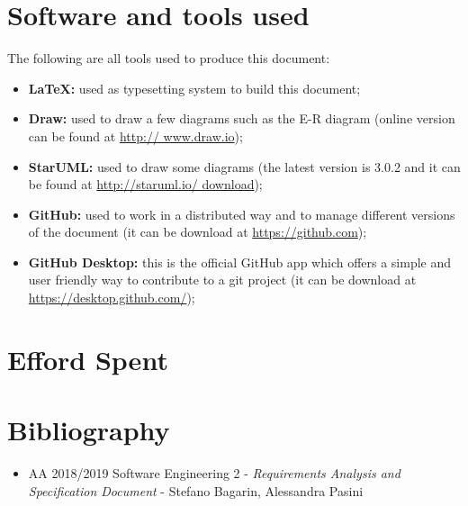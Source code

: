\section{Software and tools used}
The following are all tools used to produce this document:
\begin{itemize}
	\item \textbf{\LaTeX:} used as typesetting system to build this document;
	\item \textbf{Draw:} used to draw a few diagrams such as the E-R diagram (online version can be found at \url{http://				www.draw.io});
	\item \textbf{StarUML:} used to draw some diagrams (the latest version is 3.0.2 and it can be found at \url{http://staruml.io/			download});
	\item \textbf{GitHub:} used to work in a distributed way and to manage different versions of the document (it can be download at		\url{https://github.com});
	\item \textbf{GitHub Desktop:} this is the official GitHub app which offers a simple and user friendly way to contribute to a git 			project (it can be download at \url{https://desktop.github.com/});
\end{itemize}
\section{Efford Spent}

\section{Bibliography}
\begin{itemize}
	\item AA 2018/2019 Software Engineering 2 - \emph{Requirements Analysis and Specification Document} - Stefano Bagarin, 			Alessandra Pasini
\end{itemize}
